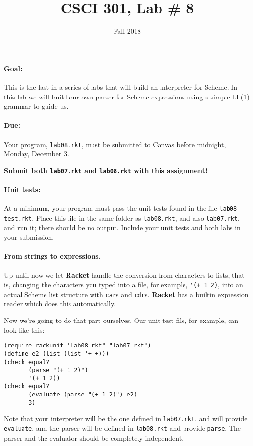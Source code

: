 \documentclass{article}
\title{CSCI 301, Lab \# 8}
\author{Fall 2018}
\date{}
\begin{document}
\maketitle


\paragraph{Goal:} This is the last in a series of labs that will
build an interpreter for Scheme.  In this lab we will build our own
parser for Scheme expressions using a simple LL(1) grammar to guide
us. 

\paragraph{Due:} Your program, {\tt lab08.rkt}, must be submitted to
Canvas before midnight, Monday, December 3.
\centerline{\large \bf Submit both {\tt lab07.rkt} and {\tt lab08.rkt} with this
  assignment!} 

\paragraph{Unit tests:}
At a minimum, your program must pass the unit tests found in the
file {\tt lab08-test.rkt}.  Place this file in the same folder
as {\tt lab08.rkt}, and also {\tt lab07.rkt},
and run it;  there should be no output.  Include
your unit tests and both labs in your submission.

\paragraph{From strings to expressions.}

Up until now we let {\bf Racket} handle the conversion from characters
to lists, that is, changing the characters you typed into a file,
for example, \verb|'(+ 1 2)|, into an actual Scheme list
structure with {\tt car}s and {\tt cdr}s.  {\bf Racket} has a builtin
expression reader which does this automatically.

Now we're going to do that part ourselves.  Our unit test file, for
example, can look like this:
\begin{Verbatim}[frame=single]
(require rackunit "lab08.rkt" "lab07.rkt")
(define e2 (list (list '+ +)))
(check equal?
       (parse "(+ 1 2)")
       '(+ 1 2))
(check equal?
       (evaluate (parse "(+ 1 2)") e2)
       3)
\end{Verbatim}
Note that your interpreter will be the one defined in {\tt lab07.rkt},
and will provide {\tt evaluate}, and the parser will be defined
in {\tt lab08.rkt} and provide {\tt parse}.  The parser and the evaluator
should be completely independent.
\end{document}
